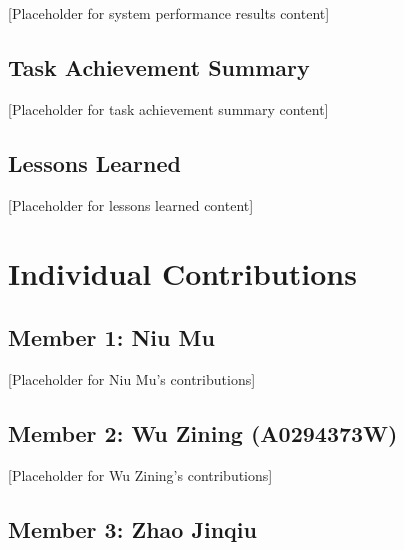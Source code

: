 \documentclass[12pt,a4paper]{article}
\begin{document}
[Placeholder for system performance results content]

\subsection{Task Achievement Summary}


[Placeholder for task achievement summary content]

\subsection{Lessons Learned}


[Placeholder for lessons learned content]

\section{Individual Contributions}


\subsection{Member 1: Niu Mu}


[Placeholder for Niu Mu's contributions]

\subsection{Member 2: Wu Zining (A0294373W)}


[Placeholder for Wu Zining's contributions]

\subsection{Member 3: Zhao Jinqiu}
\end{document}
